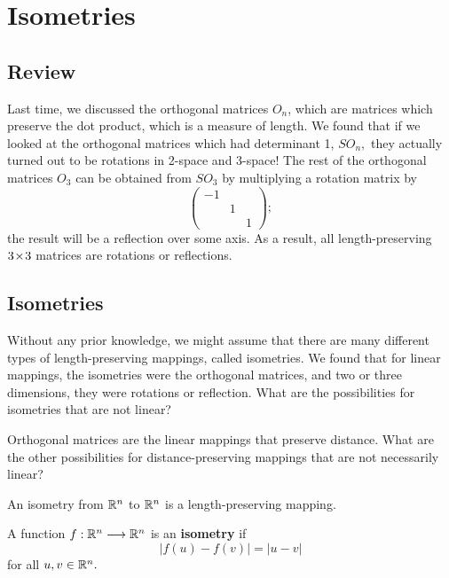 
\section{Isometries}
\subsection{Review}
Last time, we discussed the orthogonal matrices $O_n$, which are matrices which preserve the dot product, which is a measure of length. We found that if we looked at the orthogonal matrices which had determinant 1, $SO_n,$ they actually turned out to be rotations in 2-space and 3-space! The rest of the orthogonal matrices $O_3$ can be obtained from $SO_3$ by multiplying a rotation matrix by 
\[
\begin{pmatrix}
-1 & & \\
& 1 & \\
& & 1
\end{pmatrix};
\]
the result will be a reflection over some axis. As a result, all length-preserving $3 \hspace{0.05em}{\times}\hspace{0.05em} 3$ matrices are rotations or reflections. 

\subsection{Isometries}

Without any prior knowledge, we might assume that there are many different types of length-preserving mappings, called isometries. We found that for linear mappings, the isometries were the orthogonal matrices, and two or three dimensions, they were rotations or reflection. What are the possibilities for isometries that are not linear?

\begin{qq}
Orthogonal matrices are the linear mappings that preserve distance. What are the other possibilities for distance-preserving mappings that are not necessarily linear?
\end{qq}

An isometry from $\mathbb R^n$ to $\mathbb R^n$ is a length-preserving mapping. 

\begin{definition}
A function $f: \mathbb R^n \longrightarrow \mathbb R^n$ is an \textbf{isometry} if 
\[
|f(u) - f(v)| = |u - v|
\]
for all $u, v \in \mathbb R^n.$
\end{definition}

